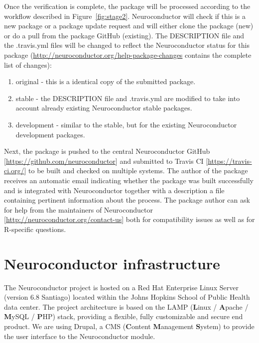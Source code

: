 \documentclass[]{elsarticle} %
\begin{document}
Once the verification is complete, the package will be processed according to the workflow described in Figure~\ref{fig:stage2}. Neuroconductor will check if this is a new package or a package update request and will either clone the package (new) or do a pull from the package GitHub (existing). The DESCRIPTION file and the .travis.yml files will be changed to reflect the Neuroconductor status for this package (\url{http://neuroconductor.org/help-package-changes} contains the complete list of changes):
\begin{enumerate}
\item original - this is a identical copy of the submitted package.
\item stable - the DESCRIPTION file and .travis.yml are modified to take into account already existing Neuroconductor stable packages.
\item development - similar to the stable, but for the existing Neuroconductor development packages.
\end{enumerate}
Next, the package is pushed to the central Neuroconductor GitHub [\url{https://github.com/neuroconductor}] and submitted to Travis CI [\url{https://travis-ci.org/}] to be built and checked on multiple systems. The author of the package receives an automatic email indicating whether the package was built successfully and is integrated with Neuroconductor together with a description a file containing pertinent information about the process. The package author can ask for help from the maintainers of Neuroconductor [\url{http://neuroconductor.org/contact-us}] both for compatibility issues as well as for R-specific questions. 




\section{Neuroconductor infrastructure}\label{sec:backend}
The Neuroconductor project is hosted on a Red Hat Enterprise Linux Server (version 6.8 Santiago) located within the Johns Hopkins School of Public Health data center. The project architecture is based on the LAMP (\textbf{L}inux / \textbf{A}pache / \textbf{M}ySQL / \textbf{P}HP) stack, providing a flexible, fully customizable and secure end product. We are using Drupal, a CMS (\textbf{C}ontent \textbf{M}anagement \textbf{S}ystem) to provide the user interface to the Neuroconductor module. 
\end{document}
